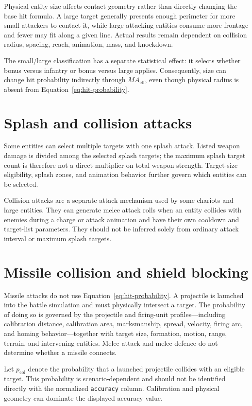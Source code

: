 \documentclass[11pt]{article}
\begin{document}
Physical entity size affects contact geometry rather than directly changing
the base hit formula.  A large target generally presents enough perimeter for
more small attackers to contact it, while large attacking entities consume
more frontage and fewer may fit along a given line.  Actual results remain
dependent on collision radius, spacing, reach, animation, mass, and knockdown.

The small/large classification has a separate statistical effect: it selects
whether bonus versus infantry or bonus versus large applies.  Consequently,
size can change hit probability indirectly through $MA_{\mathrm{eff}}$, even
though physical radius is absent from Equation~\ref{eq:hit-probability}.

\section{Splash and collision attacks}

Some entities can select multiple targets with one splash attack.  Listed
weapon damage is divided among the selected splash targets; the maximum splash
target count is therefore not a direct multiplier on total weapon strength.
Target-size eligibility, splash zones, and animation behavior further govern
which entities can be selected.

Collision attacks are a separate attack mechanism used by some chariots and
large entities.  They can generate melee attack rolls when an entity collides
with enemies during a charge or attack animation and have their own cooldown
and target-list parameters.  They should not be inferred solely from ordinary
attack interval or maximum splash targets.

\section{Missile collision and shield blocking}

Missile attacks do not use Equation~\ref{eq:hit-probability}.  A projectile is
launched into the battle simulation and must physically intersect a target.
The probability of doing so is governed by the projectile and firing-unit
profiles---including calibration distance, calibration area, marksmanship,
spread, velocity, firing arc, and homing behavior---together with target size,
formation, motion, range, terrain, and intervening entities.  Melee attack and
melee defence do not determine whether a missile connects.

Let $p_{\mathrm{col}}$ denote the probability that a launched projectile
collides with an eligible target.  This probability is scenario-dependent and
should not be identified directly with the normalized \texttt{accuracy}
column.  Calibration and physical geometry can dominate the displayed
accuracy value.
\end{document}
